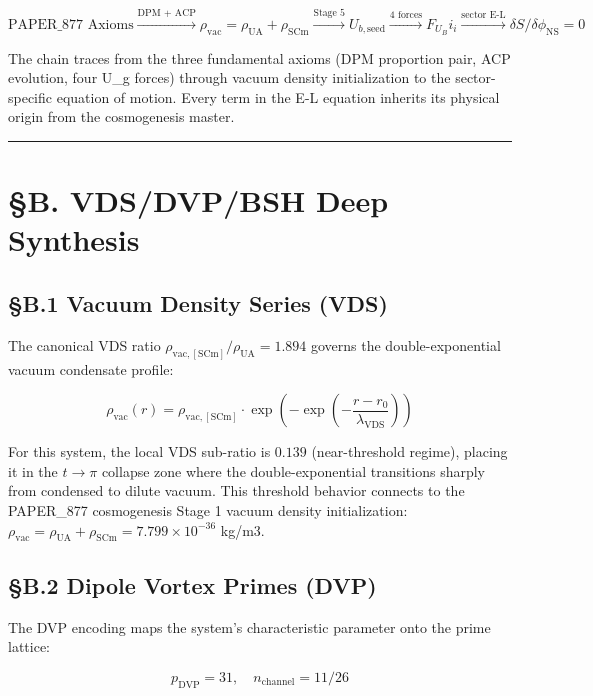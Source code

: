 \documentclass[12pt,a4paper]{article}
\begin{document}
\begin{equation}
\text{PAPER\_877 Axioms} \xrightarrow{\text{DPM + ACP}} \rho_{\mathrm{vac}} = \rho_{\mathrm{UA}} + \rho_{\mathrm{SCm}} \xrightarrow{\text{Stage 5}} U_{b,\mathrm{seed}} \xrightarrow{\text{4 forces}} F_U_Bi_i \xrightarrow{\text{sector E-L}} \delta S/\delta \phi_{\mathrm{NS}} = 0
\end{equation}

The chain traces from the three fundamental axioms (DPM proportion pair, ACP evolution, four U\_g forces) through vacuum density initialization to the sector-specific equation of motion. Every term in the E-L equation inherits its physical origin from the cosmogenesis master.

\medskip\hrule\medskip

\section{\S{}B. VDS/DVP/BSH Deep Synthesis}

\subsection{\S{}B.1 Vacuum Density Series (VDS)}

The canonical VDS ratio $\rho_{\mathrm{vac,[SCm]}} / \rho_{\mathrm{UA}} = 1.894$ governs the double-exponential vacuum condensate profile:

\begin{equation}
\rho_{\mathrm{vac}}(r) = \rho_{\mathrm{vac,[SCm]}} \cdot \exp\!\left(-\exp\!\left(-\frac{r - r_0}{\lambda_{\mathrm{VDS}}}\right)\right)
\end{equation}

For this system, the local VDS sub-ratio is $0.139$ (near-threshold regime), placing it in the $t \to \pi$ collapse zone where the double-exponential transitions sharply from condensed to dilute vacuum. This threshold behavior connects to the PAPER\_877 cosmogenesis Stage 1 vacuum density initialization: $\rho_{\mathrm{vac}} = \rho_{\mathrm{UA}} + \rho_{\mathrm{SCm}} = 7.799 \times 10^{-36}$ kg/m3.

\subsection{\S{}B.2 Dipole Vortex Primes (DVP)}

The DVP encoding maps the system's characteristic parameter onto the prime lattice:

\begin{equation}
p_{\mathrm{DVP}} = 31, \quad n_{\mathrm{channel}} = 11/26
\end{equation}
\end{document}

